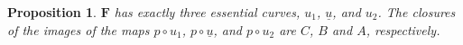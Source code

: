 \documentclass[12pt]{amsart}
\newtheorem{proposition}[theorem]{Proposition}
\theoremstyle{definition}
\begin{document}
\begin{proposition}


\bigskip


 $\mathbf{ F}$ has exactly three essential curves, $u_1$, $\underline{u}$,  and $u_2$. The closures of the images of the maps  $p \circ u_1$, $p \circ \underline{u}$,  and $p \circ u_2$ are  $C$, $B$ and $A$, respectively. 





\end{proposition}
\end{document}
